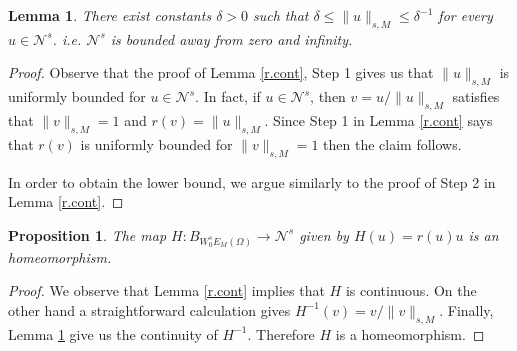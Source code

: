 \documentclass{amsart}
\newtheorem{lema}[teo]{Lemma}
\newtheorem{prop}[teo]{Proposition}
\theoremstyle{remark}
\theoremstyle{definition}
\numberwithin{equation}{section}
\begin{document}
\begin{lema}\label{invH.cont}
There exist constants $\delta>0$  such that $\delta \le \|u\|_{s, M}\le \delta^{-1}$ for every $u\in \mathcal N^s$. i.e. $\mathcal N^s$ is bounded away from zero and infinity.
\end{lema}

\begin{proof}
Observe that the proof of Lemma \ref{r.cont}, Step 1 gives us that $\|u\|_{s, M}$ is uniformly bounded for $u\in \mathcal N^s$. In fact, if $u\in \mathcal N^s$, then $v=u/\|u\|_{s, M}$ satisfies that $\|v\|_{s, M}=1$ and $r(v)=\|u\|_{s, M}$. Since Step 1 in Lemma \ref{r.cont} says that $r(v)$ is uniformly bounded for $\|v\|_{s, M}=1$ then the claim follows.

In order to obtain the lower bound, we argue similarly to the proof of Step 2 in Lemma \ref{r.cont}.

\end{proof}
\begin{prop}\label{H.homeo}
The map $H\colon B_{W^s_0E_M(\Omega)} \to \mathcal N^s$ given by $H(u) = r(u)u$ is an homeomorphism.
\end{prop}

\begin{proof}
We observe that Lemma \ref{r.cont} implies that $H$ is continuous. On the other hand a straightforward calculation gives $H^{-1}(v) = v/\|v\|_{s, M}$. Finally, Lemma \ref{invH.cont} give us the continuity of $H^{-1}$. Therefore $H$ is a homeomorphism.
\end{proof}
\end{document}
